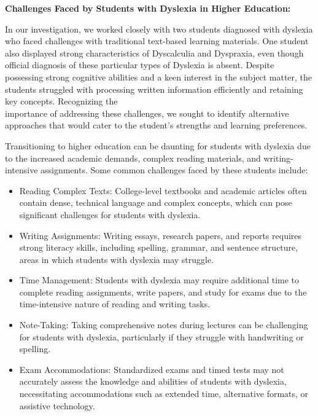 \documentclass[a4paper,12pt]{article}
\begin{document}
\begin{large}
\textbf{Challenges Faced by Students with Dyslexia in Higher Education:}

In our investigation, we worked closely with two students diagnosed with dyslexia who faced challenges with traditional text-based learning materials. One student also displayed strong characteristics of Dyscalculia and Dyspraxia, even though official diagnosis of these particular types of Dyslexia is absent. Despite possessing strong cognitive abilities and a keen interest in the subject matter, the students struggled with processing written information efficiently and retaining key concepts. Recognizing the\\ importance of addressing these challenges, we sought to identify alternative approaches that would cater to the student's strengths and learning preferences.

Transitioning to higher education can be daunting for students with dyslexia due to the increased academic demands, complex reading materials, and writing-intensive assignments. Some common challenges faced by these students include:

\begin{itemize}
\item Reading Complex Texts: College-level textbooks and academic articles often contain dense, technical language and complex concepts, which can pose significant challenges for students with dyslexia.

\item Writing Assignments: Writing essays, research papers, and reports requires strong literacy skills, including spelling, grammar, and sentence structure, areas in which students with dyslexia may struggle.

\item Time Management: Students with dyslexia may require additional time to complete reading assignments, write papers, and study for exams due to the time-intensive nature of reading and writing tasks.

\item Note-Taking: Taking comprehensive notes during lectures can be challenging for students with dyslexia, particularly if they struggle with handwriting or spelling.

\item Exam Accommodations: Standardized exams and timed tests may not accurately assess the knowledge and abilities of students with dyslexia, necessitating accommodations such as extended time, alternative formats, or assistive technology.
\end{itemize}


\end{large}
\end{document}
